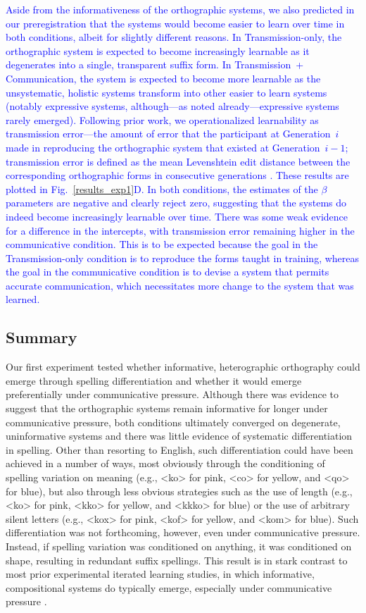 \documentclass[doc,biblatex]{apa7}
\newcommand\newmaterial[1]{\textcolor{blue}{#1}}
\begin{document}
\newmaterial{Aside from the informativeness of the orthographic systems, we also predicted in our preregistration that the systems would become easier to learn over time in both conditions, albeit for slightly different reasons. In Transmission-only, the orthographic system is expected to become increasingly learnable as it degenerates into a single, transparent suffix form. In Transmission~+ Communication, the system is expected to become more learnable as the unsystematic, holistic systems transform into other easier to learn systems (notably expressive systems, although---as noted already---expressive systems rarely emerged). Following prior work, we operationalized learnability as transmission error---the amount of error that the participant at Generation~$i$ made in reproducing the orthographic system that existed at Generation~$i-1$; transmission error is defined as the mean Levenshtein edit distance between the corresponding orthographic forms in consecutive generations \parencite[see e.g.,][]{Kirby:2008}. These results are plotted in Fig.~\ref{results_exp1}D. In both conditions, the estimates of the $\beta$ parameters are negative and clearly reject zero, suggesting that the systems do indeed become increasingly learnable over time. There was some weak evidence for a difference in the intercepts, with transmission error remaining higher in the communicative condition. This is to be expected because the goal in the Transmission-only condition is to reproduce the forms taught in training, whereas the goal in the communicative condition is to devise a system that permits accurate communication, which necessitates more change to the system that was learned.}

\subsection{Summary}

Our first experiment tested whether informative, heterographic orthography could emerge through spelling differentiation and whether it would emerge preferentially under communicative pressure. Although there was evidence to suggest that the orthographic systems remain informative for longer under communicative pressure, both conditions ultimately converged on degenerate, uninformative systems and there was little evidence of systematic differentiation in spelling. Other than resorting to English, such differentiation could have been achieved in a number of ways, most obviously through the conditioning of spelling variation on meaning (e.g., <ko> for pink, <co> for yellow, and <qo> for blue), but also through less obvious strategies such as the use of length (e.g., <ko> for pink, <kko> for yellow, and <kkko> for blue) or the use of arbitrary silent letters (e.g., <kox> for pink, <kof> for yellow, and <kom> for blue). Such differentiation was not forthcoming, however, even under communicative pressure. Instead, if spelling variation was conditioned on anything, it was conditioned on shape, resulting in redundant suffix spellings. This result is in stark contrast to most prior experimental iterated learning studies, in which informative, compositional systems do typically emerge, especially under communicative pressure \parencite[e.g.,][]{Kirby:2015}.
\end{document}
